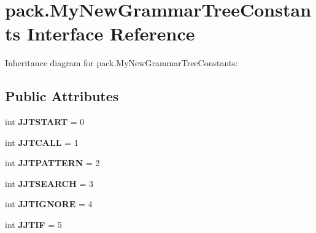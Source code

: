 \hypertarget{interfacepack_1_1_my_new_grammar_tree_constants}{}\section{pack.\+My\+New\+Grammar\+Tree\+Constants Interface Reference}
\label{interfacepack_1_1_my_new_grammar_tree_constants}


Inheritance diagram for pack.\+My\+New\+Grammar\+Tree\+Constants\+:
\subsection*{Public Attributes}
\begin{DoxyCompactItemize}
\item 
int {\bfseries J\+J\+T\+S\+T\+A\+RT} = 0\hypertarget{interfacepack_1_1_my_new_grammar_tree_constants_ad1100118e5d0020193ab5f857451211d}{}\label{interfacepack_1_1_my_new_grammar_tree_constants_ad1100118e5d0020193ab5f857451211d}

\item 
int {\bfseries J\+J\+T\+C\+A\+LL} = 1\hypertarget{interfacepack_1_1_my_new_grammar_tree_constants_a7554b79fda0b935b4fdf2d81fcd8c889}{}\label{interfacepack_1_1_my_new_grammar_tree_constants_a7554b79fda0b935b4fdf2d81fcd8c889}

\item 
int {\bfseries J\+J\+T\+P\+A\+T\+T\+E\+RN} = 2\hypertarget{interfacepack_1_1_my_new_grammar_tree_constants_ab7c55060317956b3a44a3533468b4d2a}{}\label{interfacepack_1_1_my_new_grammar_tree_constants_ab7c55060317956b3a44a3533468b4d2a}

\item 
int {\bfseries J\+J\+T\+S\+E\+A\+R\+CH} = 3\hypertarget{interfacepack_1_1_my_new_grammar_tree_constants_a0e25bfd11c15f257560861951ba321f1}{}\label{interfacepack_1_1_my_new_grammar_tree_constants_a0e25bfd11c15f257560861951ba321f1}

\item 
int {\bfseries J\+J\+T\+I\+G\+N\+O\+RE} = 4\hypertarget{interfacepack_1_1_my_new_grammar_tree_constants_aa40a08b67910bb6bff59af7602e3a9cc}{}\label{interfacepack_1_1_my_new_grammar_tree_constants_aa40a08b67910bb6bff59af7602e3a9cc}

\item 
int {\bfseries J\+J\+T\+IF} = 5\hypertarget{interfacepack_1_1_my_new_grammar_tree_constants_a74b77635aa5a454a4d440d500bdb9164}{}\label{interfacepack_1_1_my_new_grammar_tree_constants_a74b77635aa5a454a4d440d500bdb9164}


\end{DoxyCompactItemize}
